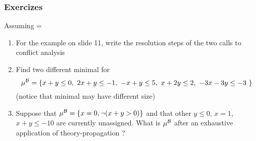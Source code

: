 \begin{frame}
  \frametitle{Exercizes}

  Assuming \T = \Lia
  \vfill
  \begin{enumerate}

    \item For the example on slide 11, write the resolution
          steps of the two calls to conflict analysis

    \vfill

    \item Find two different minimal \tconflicts for
	  $$\babst{\mu} = \{  x + y \leq 0,\ 
	                     2x + y \leq -1,\ 
			    - x + y \leq 5,\
			      x + 2y \leq 2,\ 
			    -3x - 3y \leq -3\
			  \}$$
	  (notice that minimal \tconflicts may have different size)

    \vfill
    
    \item Suppose that 
          $\mu^{\mathcal{B}} = \{ x = 0, \neg (x + y > 0) \}$
	  and that other \tatoms $y \leq 0$, $x = 1$, $x + y \leq -10$
	  are currently unassigned. What is $\mu^{\mathcal{B}}$ after
	  an exhaustive application of theory-propagation ?

  \end{enumerate}

\end{frame}

